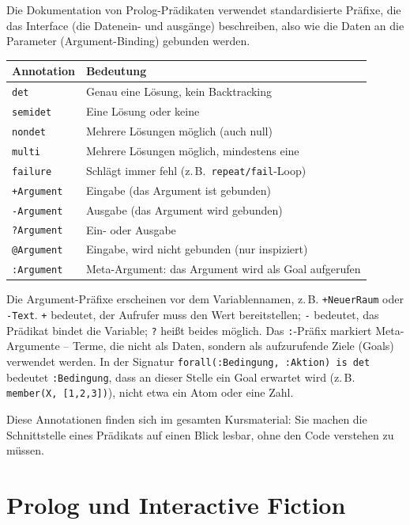 \documentclass[parskip=half,a4paper,11pt]{scrreprt}
\begin{document}
Die Dokumentation von Prolog-Prädikaten verwendet standardisierte Präfixe, die das Interface (die Datenein- und ausgänge) beschreiben, also wie die Daten an die Parameter (Argument-Binding) gebunden werden.

\begin{center}
\begin{tabular}{ll}
\toprule
\textbf{Annotation} & \textbf{Bedeutung} \\
\midrule
\texttt{det} & Genau eine Lösung, kein Backtracking \\
\texttt{semidet} & Eine Lösung oder keine \\
\texttt{nondet} & Mehrere Lösungen möglich (auch null) \\
\texttt{multi} & Mehrere Lösungen möglich, mindestens eine \\
\texttt{failure} & Schlägt immer fehl (z.\,B.\ \texttt{repeat/fail}-Loop) \\
\texttt{+Argument} & Eingabe (das Argument ist gebunden) \\
\texttt{-Argument} & Ausgabe (das Argument wird gebunden) \\
\texttt{?Argument} & Ein- oder Ausgabe \\
\texttt{@Argument} & Eingabe, wird nicht gebunden (nur inspiziert) \\
\texttt{:Argument} & Meta-Argument: das Argument wird als Goal aufgerufen \\
\bottomrule
\end{tabular}
\end{center}

Die Argument-Präfixe erscheinen vor dem Variablennamen, z.\,B. \texttt{+NeuerRaum} oder \texttt{-Text}. \texttt{+} bedeutet, der Aufrufer muss den Wert bereitstellen; \texttt{-} bedeutet, das Prädikat bindet die Variable; \texttt{?} heißt beides möglich. Das \texttt{:}-Präfix markiert Meta-Argumente – Terme, die nicht als Daten, sondern als aufzurufende Ziele (Goals) verwendet werden. In der Signatur \texttt{forall(:Bedingung, :Aktion) is det} bedeutet \texttt{:Bedingung}, dass an dieser Stelle ein Goal erwartet wird (z.\,B. \texttt{member(X, [1,2,3])}), nicht etwa ein Atom oder eine Zahl.

Diese Annotationen finden sich im gesamten Kursmaterial: Sie machen die Schnittstelle eines Prädikats auf einen Blick lesbar, ohne den Code verstehen zu müssen.

\section{Prolog und Interactive Fiction}
\end{document}
